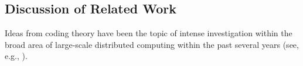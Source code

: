 \documentclass[journal,draftcls,onecolumn]{IEEEtran}
\theoremstyle{mystyle}
\newcommand{\calD}{\mathcal{D}}
\newcommand{\aditya}[1]{\marginpar{+}{\bf Aditya's remark}: {\em #1}}
\begin{document}







\vspace{-0.1in}
\subsection{Discussion of Related Work} %
Ideas from coding theory have been the topic of intense investigation within the broad area of large-scale distributed computing within the past several years (see, e.g.,  \cite{yu2020straggler,saurav_g_analytics,DBLP:journals/corr/abs-1806-00939, LiMA16, dutta2016short, dutta_et_al20,tandon_gradient,dimakis_cyclic_mds}). %
\end{document}
